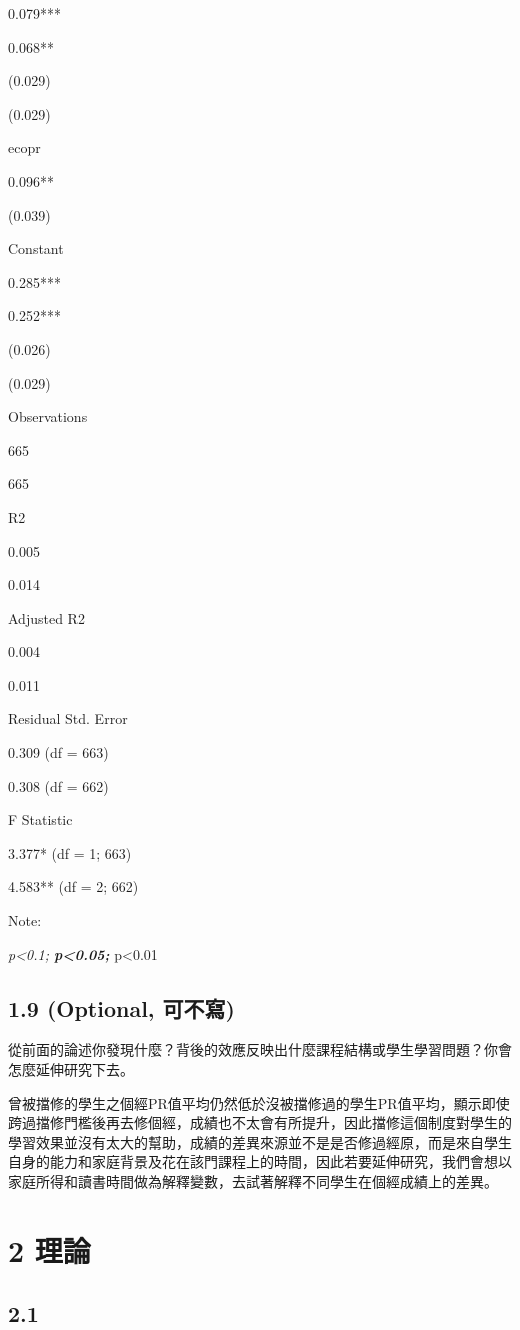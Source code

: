 \documentclass[]{article}
\begin{document}
0.079***

0.068**

(0.029)

(0.029)

ecopr

0.096**

(0.039)

Constant

0.285***

0.252***

(0.026)

(0.029)

Observations

665

665

R2

0.005

0.014

Adjusted R2

0.004

0.011

Residual Std. Error

0.309 (df = 663)

0.308 (df = 662)

F Statistic

3.377* (df = 1; 663)

4.583** (df = 2; 662)

Note:

\emph{p\textless{}0.1; \textbf{p\textless{}0.05; }}p\textless{}0.01

\subsection{1.9 (Optional, 可不寫)}\label{optional-}

從前面的論述你發現什麼？背後的效應反映出什麼課程結構或學生學習問題？你會怎麼延伸研究下去。

曾被擋修的學生之個經PR值平均仍然低於沒被擋修過的學生PR值平均，顯示即使跨過擋修門檻後再去修個經，成績也不太會有所提升，因此擋修這個制度對學生的學習效果並沒有太大的幫助，成績的差異來源並不是是否修過經原，而是來自學生自身的能力和家庭背景及花在該門課程上的時間，因此若要延伸研究，我們會想以家庭所得和讀書時間做為解釋變數，去試著解釋不同學生在個經成績上的差異。

\section{2 理論}

\subsection{2.1}\label{section}
\end{document}
